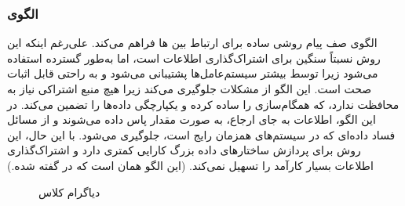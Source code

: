 \subsubsection{الگوی }
\label{archConMessageQueSec}
\begin{RTL}
الگوی صف پیام \cite{ref4} روشی ساده برای ارتباط بین  ها فراهم می‌کند.
علی‌رغم اینکه این روش نسبتاً سنگین برای اشتراک‌گذاری اطلاعات است، اما به‌طور گسترده
استفاده می‌شود زیرا توسط بیشتر سیستم‌عامل‌ها پشتیبانی می‌شود و به راحتی
قابل اثبات صحت است. این الگو از مشکلات 
جلوگیری می‌کند زیرا هیچ منبع اشتراکی نیاز به محافظت ندارد، که همگام‌سازی را ساده کرده
و یکپارچگی داده‌ها را تضمین می‌کند. در این الگو، اطلاعات به جای ارجاع،
به صورت مقدار پاس داده می‌شوند و از مسائل فساد داده‌ای
که در سیستم‌های همزمان رایج است، جلوگیری می‌شود. با این حال،
این روش برای پردازش ساختارهای داده بزرگ کارایی کمتری دارد
و اشتراک‌گذاری اطلاعات بسیار کارآمد را تسهیل نمی‌کند.
(این الگو همان  است که در
\cite{ref1} گفته شده.)
\end{RTL}
\begin{figure}[h!]
\centering
{}
\caption{دیاگرام کلاس }
\label{archConMessageQueClassDiag}
\end{figure}